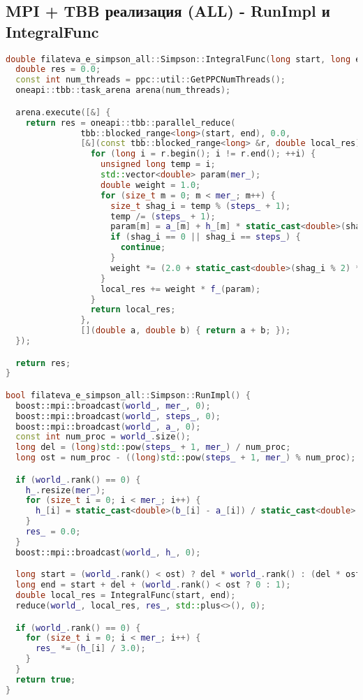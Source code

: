\documentclass[12pt]{article}
\begin{document}
\subsection{MPI + TBB реализация (ALL) - RunImpl и IntegralFunc}
\begin{lstlisting}[language=C++]
double filateva_e_simpson_all::Simpson::IntegralFunc(long start, long end) {
  double res = 0.0;
  const int num_threads = ppc::util::GetPPCNumThreads();
  oneapi::tbb::task_arena arena(num_threads);

  arena.execute([&] {
    return res = oneapi::tbb::parallel_reduce(
               tbb::blocked_range<long>(start, end), 0.0,
               [&](const tbb::blocked_range<long> &r, double local_res) {
                 for (long i = r.begin(); i != r.end(); ++i) {
                   unsigned long temp = i;
                   std::vector<double> param(mer_);
                   double weight = 1.0;
                   for (size_t m = 0; m < mer_; m++) {
                     size_t shag_i = temp % (steps_ + 1);
                     temp /= (steps_ + 1);
                     param[m] = a_[m] + h_[m] * static_cast<double>(shag_i);
                     if (shag_i == 0 || shag_i == steps_) {
                       continue;
                     }
                     weight *= (2.0 + static_cast<double>(shag_i % 2) * 2);
                   }
                   local_res += weight * f_(param);
                 }
                 return local_res;
               },
               [](double a, double b) { return a + b; });
  });

  return res;
}

bool filateva_e_simpson_all::Simpson::RunImpl() {
  boost::mpi::broadcast(world_, mer_, 0);
  boost::mpi::broadcast(world_, steps_, 0);
  boost::mpi::broadcast(world_, a_, 0);
  const int num_proc = world_.size();
  long del = (long)std::pow(steps_ + 1, mer_) / num_proc;
  long ost = num_proc - ((long)std::pow(steps_ + 1, mer_) % num_proc);

  if (world_.rank() == 0) {
    h_.resize(mer_);
    for (size_t i = 0; i < mer_; i++) {
      h_[i] = static_cast<double>(b_[i] - a_[i]) / static_cast<double>(steps_);
    }
    res_ = 0.0;
  }
  boost::mpi::broadcast(world_, h_, 0);

  long start = (world_.rank() < ost) ? del * world_.rank() : (del * ost) + ((del + 1) * (world_.rank() - ost));
  long end = start + del + (world_.rank() < ost ? 0 : 1);
  double local_res = IntegralFunc(start, end);
  reduce(world_, local_res, res_, std::plus<>(), 0);

  if (world_.rank() == 0) {
    for (size_t i = 0; i < mer_; i++) {
      res_ *= (h_[i] / 3.0);
    }
  }
  return true;
}
\end{lstlisting}
\end{document}
